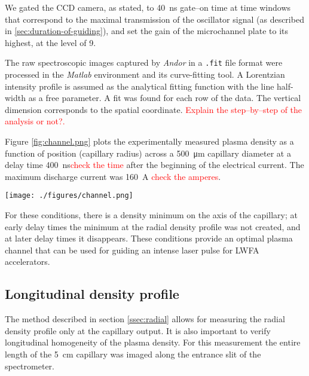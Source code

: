 \documentclass[nofonts]{tufte-book}
\begin{document}
We gated the CCD camera, as stated, to \SI{40}{\ns} gate--on time at time windows that correspond to the maximal transmission of the oscillator signal (as described in \ref{sec:duration-of-guiding}), and set the gain of the microchannel plate to its highest, at the level of 9.

The raw spectroscopic images captured by \textit{Andor} in a \texttt{.fit} file format were processed in the \textit{Matlab} environment and its curve-fitting tool. A Lorentzian intensity profile is assumed as the analytical fitting function with the line half-width as a free parameter. A fit was found for each row of the data. The vertical dimension corresponds to the spatial coordinate. \textcolor{red}{Explain the step--by--step of the analysis or not?.}

Figure \ref{fig:channel.png} plots the experimentally measured plasma density as a function of position (capillary radius) across a \SI{500}{\um} capillary diameter at a delay time \SI{400}{\ns}\textcolor{red}{check the time} after the beginning of the electrical current. The maximum discharge current was \SI{160}{\A} \textcolor{red}{check the amperes}.

	\begin{marginfigure}
	    \texttt{[image: ./figures/channel.png]}
	    \caption{Radial density profile of the plasma from the measured spectrum, \SI{400}{\ns} \textcolor{red}{check the number} after the beginning of the current.}
	    \label{fig:plasma_channel_spectro}
	\end{marginfigure}

For these conditions, there is a density minimum on the axis of the capillary; at early delay times the minimum at the radial density profile was not created, and at later delay times it disappears. These conditions provide an optimal plasma channel that can be used for guiding an intense laser pulse for LWFA accelerators.

\subsection{Longitudinal density profile}\label{ssec:longi}

The method described in section \ref{ssec:radial} allows for measuring the radial density profile only at the capillary output. It is also important to verify longitudinal homogeneity of the plasma density. For this measurement the entire length of the \SI{5}{\cm} capillary was imaged along the entrance slit of the spectrometer.
\end{document}

